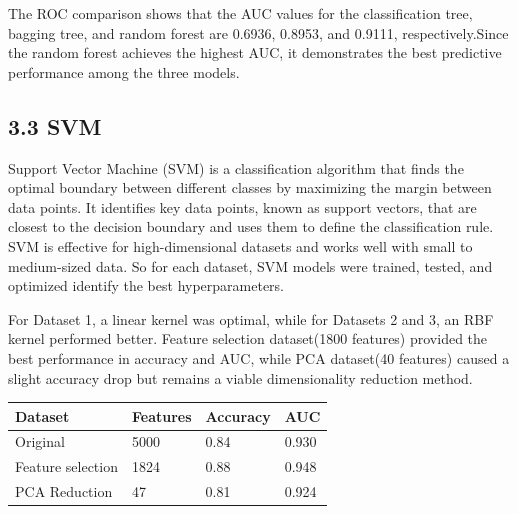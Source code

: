 \documentclass[
  12pt,
  letterpaper,
  DIV=11,
  numbers=noendperiod]{scrartcl}
\begin{document}
The ROC comparison shows that the AUC values for the classification
tree, bagging tree, and random forest are 0.6936, 0.8953, and 0.9111,
respectively.Since the random forest achieves the highest AUC, it
demonstrates the best predictive performance among the three models.

\subsection{3.3 SVM}\label{svm}

Support Vector Machine (SVM) is a classification algorithm that finds
the optimal boundary between different classes by maximizing the margin
between data points. It identifies key data points, known as support
vectors, that are closest to the decision boundary and uses them to
define the classification rule. SVM is effective for high-dimensional
datasets and works well with small to medium-sized data. So for each
dataset, SVM models were trained, tested, and optimized identify the
best hyperparameters.

For Dataset 1, a linear kernel was optimal, while for Datasets 2 and 3,
an RBF kernel performed better. Feature selection dataset(1800 features)
provided the best performance in accuracy and AUC, while PCA dataset(40
features) caused a slight accuracy drop but remains a viable
dimensionality reduction method.

\begin{longtable}[]{@{}llll@{}}
\toprule\noalign{}
Dataset & Features & Accuracy & AUC \\
\midrule\noalign{}
\endhead
\bottomrule\noalign{}
\endlastfoot
Original & 5000 & 0.84 & 0.930 \\
Feature selection & 1824 & 0.88 & 0.948 \\
PCA Reduction & 47 & 0.81 & 0.924 \\
\end{longtable}
\end{document}
